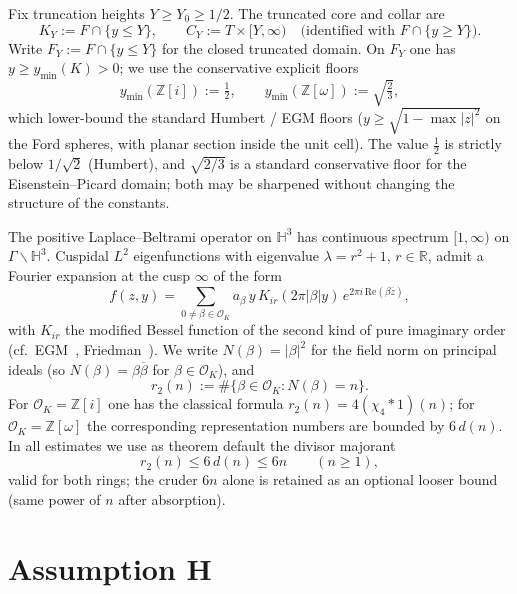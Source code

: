 \documentclass[11pt]{amsart}
\theoremstyle{definition}
\newcommand{\HH}{\mathbb{H}^3}
\newcommand{\RR}{\mathbb{R}}
\newcommand{\ZZ}{\mathbb{Z}}
\newcommand{\OK}{\mathcal{O}_K}
\newcommand{\abs}[1]{\lvert#1\rvert}
\begin{document}
Fix truncation heights $Y\ge Y_0\ge 1/2$.  The truncated core and collar
are
\[
  K_Y := F\cap\{y\le Y\},\qquad
  C_Y := T\times[Y,\infty)
  \quad\bigl(\text{identified with }F\cap\{y\ge Y\}\bigr).
\]
Write $F_Y:=F\cap\{y\le Y\}$ for the closed truncated domain.  On $F_Y$
one has $y\ge y_{\min}(K)>0$; we use the conservative explicit floors
\begin{equation}
\label{eq:ymin}
  y_{\min}(\ZZ[i])
  :=
  \tfrac12,
  \qquad
  y_{\min}(\ZZ[\omega])
  :=
  \sqrt{\tfrac23},
\end{equation}
which lower-bound the standard Humbert / EGM floors
($y\ge\sqrt{1-\max\abs{z}^2}$ on the Ford spheres, with planar section
inside the unit cell).  The value $\tfrac12$ is strictly below
$1/\sqrt{2}$ (Humbert), and $\sqrt{2/3}$ is a standard conservative floor
for the Eisenstein--Picard domain; both may be sharpened without changing
the structure of the constants.

The positive Laplace--Beltrami operator on $\HH$ has continuous spectrum
$[1,\infty)$ on $\Gamma\backslash\HH$.  Cuspidal $L^2$ eigenfunctions
with eigenvalue $\lambda=r^2+1$, $r\in\RR$, admit a Fourier expansion at
the cusp $\infty$ of the form
\begin{equation}
\label{eq:fourier}
  f(z,y)
  =
  \sum_{0\neq\beta\in\OK}
  a_\beta\,
  y\,K_{ir}(2\pi\abs{\beta}y)\,
  e^{2\pi i\,\mathrm{Re}(\beta\overline{z})},
\end{equation}
with $K_{ir}$ the modified Bessel function of the second kind of pure
imaginary order (cf.\ EGM~\cite{EGM}, Friedman~\cite{Friedman}).  We write
$N(\beta)=\abs{\beta}^2$ for the field norm on principal ideals (so
$N(\beta)=\beta\overline{\beta}$ for $\beta\in\OK$), and
\[
  r_2(n) := \#\{\beta\in\OK:N(\beta)=n\}.
\]
For $\OK=\ZZ[i]$ one has the classical formula $r_2(n)=4(\chi_4*1)(n)$;
for $\OK=\ZZ[\omega]$ the corresponding representation numbers are
bounded by $6\,d(n)$.  In all estimates we use as theorem default the
divisor majorant
\begin{equation}
\label{eq:r2maj}
  r_2(n)\le 6\,d(n)\le 6n
  \qquad(n\ge 1),
\end{equation}
valid for both rings; the cruder $6n$ alone is retained as an optional
looser bound (same power of $n$ after absorption).

\section{Assumption H}
\label{sec:H}
\end{document}
